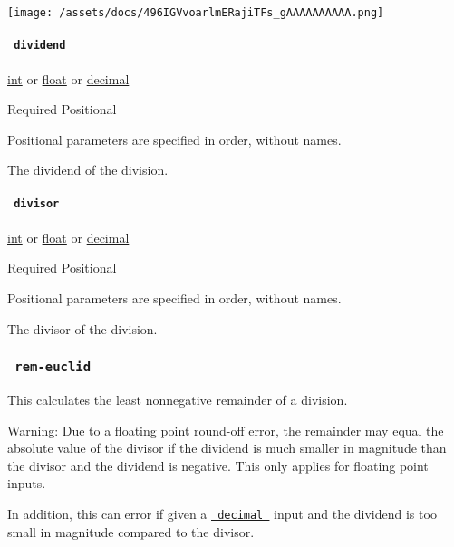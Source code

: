 \texttt{[image: /assets/docs/496IGVvoarlmERajiTFs\_gAAAAAAAAAA.png]}

\paragraph{\texorpdfstring{\texttt{\ dividend\ }}{ dividend }}\label{functions-div-euclid-dividend}

\href{/docs/reference/foundations/int/}{int} {or}
\href{/docs/reference/foundations/float/}{float} {or}
\href{/docs/reference/foundations/decimal/}{decimal}

{Required} {{ Positional }}

\label{functions-div-euclid-dividend-positional-tooltip}
Positional parameters are specified in order, without names.

The dividend of the division.

\paragraph{\texorpdfstring{\texttt{\ divisor\ }}{ divisor }}\label{functions-div-euclid-divisor}

\href{/docs/reference/foundations/int/}{int} {or}
\href{/docs/reference/foundations/float/}{float} {or}
\href{/docs/reference/foundations/decimal/}{decimal}

{Required} {{ Positional }}

\label{functions-div-euclid-divisor-positional-tooltip}
Positional parameters are specified in order, without names.

The divisor of the division.

\subsubsection{\texorpdfstring{\texttt{\ rem-euclid\ }}{ rem-euclid }}\label{functions-rem-euclid}

This calculates the least nonnegative remainder of a division.

Warning: Due to a floating point round-off error, the remainder may
equal the absolute value of the divisor if the dividend is much smaller
in magnitude than the divisor and the dividend is negative. This only
applies for floating point inputs.

In addition, this can error if given a
\href{/docs/reference/foundations/decimal/}{\texttt{\ decimal\ }} input
and the dividend is too small in magnitude compared to the divisor.


